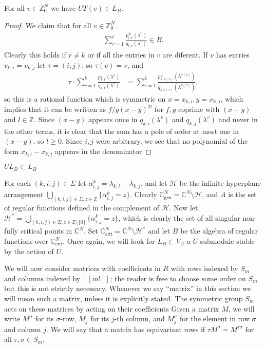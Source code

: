 \documentclass[11pt,fleqn]{article}
\newcommand\CC{\mathbb C}
\newcommand\ZZ{\mathbb Z}
\renewcommand\H{\mathcal H}
\newcommand\gen{\mathsf{gen}}
\newcommand\crit{\mathsf{crit}}
\begin{document}
\begin{Lemma*}
For all $v \in \ZZ^N_0$ we have $U T(v) \in L_B$.
\end{Lemma*}
\begin{proof}
We claim that for all $v \in \ZZ^N_0$. 
\begin{align*}
\sum_{r=1}^t \frac{p_{t,r}^\pm(\lambda^v)}{q_{t,r}(\lambda^v)} \in B.
\end{align*}
Clearly this holds if $r \neq k$ or if all the entries in $v$ are diferent. If
$v$ has entries $v_{k,i} = v_{k,j}$ let $\tau = (i,j)$, so $\tau(v) = v$, and
\begin{align*}
\tau \cdot \sum_{r=1}^k \frac{p_{k,r}^\pm(\lambda^v)}{q_{k,r}(\lambda^v)}
	&= \sum_{r=1}^k \frac{p_{k,\tau(r)}^\pm(\lambda^{\tau(v)})}
	{q_{k,\tau(r)}(\lambda^{\tau(v)})},
\end{align*}
so this is a rational function which is symmetric on $x =x_{k,i}, y =x_{k,j}$, 
which implies that it can be written as $f/g (x-y)^{2l}$ for $f,g$ coprime 
with $(x-y)$ and $l \in \ZZ$. Since $(x-y)$ appears once in 
$q_{k,i}(\lambda^v)$ and $q_{k,j}(\lambda^v)$ and never in the other terms, it 
is clear that the sum has a pole of order at most one in $(x-y)$, so $l \geq 
0$. Since $i,j$ were arbitrary, we see that no polynomial of the form $x_{k,i} 
- x_{k,j}$ appears in the denominator
\end{proof}


\begin{Proposition}
$U L_B \subset L_B$
\end{Proposition}


\newpage
For each $(k,i,j) \in \Sigma$ let $\alpha^k_{i,j} = \lambda_{k,i} - 
\lambda_{k,j}$, and let $\mathcal H$ be the infinite hyperplane arrangement
$\bigcup_{(k,i,j) \in \Sigma, z \in \ZZ} \{\alpha_{i,j}^k = z\}$. Clearly
$\CC^N_\gen = \CC^N \setminus \H$, and $A$ is the set of regular functions
defined in the complement of $\H$. Now let $\H^* = \bigcup_{(k,i,j) \in 
\Sigma, z \in \ZZ\setminus \{0\}} \{\alpha_{i,j}^k = z\}$, which is clearly
the set of all singular non-fully critical points in $\CC^N$. Set $\CC^N_\crit
= \CC^N \setminus \H^*$ and let $B$ be the algebra of regular functions over
$\CC^N_\crit$. Once again, we will look for $L_B \subset V_A$ a $U$-submodule
stable by the action of $U$.


We will now consider matrices with coefficients in $R$ with rows indexed by 
$S_m$ and columns indexed by $[[m!]]$; the reader is free to choose some order 
on $S_m$ but this is not strictly necessary. Whenever we say ``matrix'' in 
this section we will mean such a matrix, unless it is explicitly stated. The 
symmetric group $S_m$ acts on these matrices by acting on their coefficients 
Given a matrix $M$, we will write $M^\sigma$ for its $\sigma$-row, $M_j$ for 
its $j$-th column, and $M^\sigma_j$ for the element in row $\sigma$ and column 
$j$. We will say that a matrix has equivariant rows if $\tau M^\sigma = 
M^{\tau \sigma}$ for all $\tau, \sigma \in S_m$.
\end{document}
